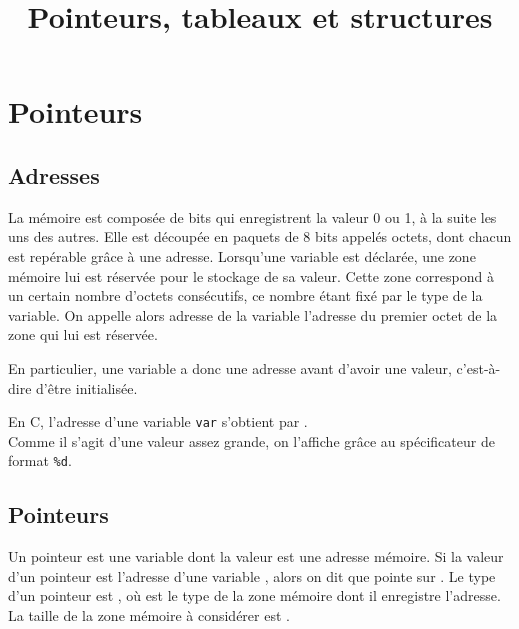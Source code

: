 


	
\title{Pointeurs, tableaux et structures}

\section{Pointeurs}

	\subsection{Adresses}
	
		La mémoire est composée de bits qui enregistrent la valeur 0 ou 1, à la suite les uns des autres.
		Elle est découpée en paquets de 8 bits appelés octets, dont chacun est repérable grâce à une adresse. \nll
		Lorsqu'une variable est déclarée, une zone mémoire lui est réservée pour le stockage de sa valeur. Cette zone correspond à un certain nombre d'octets consécutifs, ce nombre étant fixé par le type de la variable. On appelle alors adresse de la variable l'adresse du premier octet de la zone qui lui est réservée.
		
		\begin{Remarque}
			En particulier, une variable a donc une adresse avant d'avoir une valeur, c'est-à-dire d'être initialisée.
		\end{Remarque}
	
		En C, l'adresse d'une variable \texttt{var} s'obtient par . \\
		Comme il s'agit d'une valeur assez grande, on l'affiche grâce au spécificateur de format \texttt{\%d}.
		
		\begin{Exemple}
			
		\end{Exemple}
	
	\subsection{Pointeurs}
		
		\begin{Definition}[pointeur en C]
			Un pointeur est une variable dont la valeur est une adresse mémoire. Si la valeur d'un pointeur  est l'adresse d'une variable , alors on dit que  pointe sur . \nt
			Le type d'un pointeur est , où  est le type de la zone mémoire dont il enregistre l'adresse. \\
			La taille de la zone mémoire à considérer est .
		\end{Definition}
		
